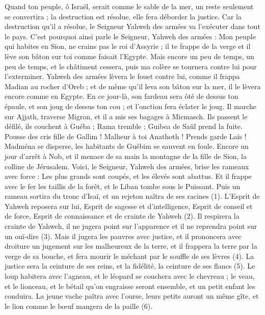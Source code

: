 \begin{multicols}{2}
Quand ton peuple, ô Israël, serait comme le sable de la mer, un reste seulement se convertira ; la destruction est résolue, elle fera déborder la justice.
Car la destruction qu’il a résolue, le Seigneur Yahweh des armées va l’exécuter dans tout le pays.
C'est pourquoi ainsi parle le Seigneur, Yahweh des armées : Mon peuple qui habites en Sion, ne crains pas le roi d'Assyrie ; il te frappe de la verge et il lève son bâton sur toi comme faisait l’Egypte.
Mais encore un peu de temps, un peu de temps, et le châtiment cessera, puis ma colère se tournera contre lui pour l’exterminer.
Yahweh des armées lèvera le fouet contre lui, comme il frappa Madian au rocher d'Oreb ; et de même qu’il leva son bâton sur la mer, il le lèvera encore comme en Egypte.
En ce jour-là, son fardeau sera ôté de dessus ton épaule, et son joug de dessus ton cou ; et l’onction fera éclater le joug.
Il marche sur Ajjath, traverse Migron, et il a mis ses bagages à Micmasch.
Ils passent le défilé, ils couchent à Guéba ; Rama tremble ; Guibea de Saül prend la fuite.
Pousse des cris fille de Gallim ! Malheur à toi Anathoth ! Prends garde Laïs !
Madména se disperse, les habitants de Guébim se sauvent en foule.
Encore un jour d’arrêt à Nob, et il menace de sa main la montagne de la fille de Sion, la colline de Jérusalem.
Voici, le Seigneur, Yahweh des armées, brise les rameaux avec force : Les plus grands sont coupés, et les élevés sont abattus.
Et il frappe avec le fer les taillis de la forêt, et le Liban tombe sous le Puissant.
\VerseOne{}Puis un rameau sortira du tronc d'Isaï, et un rejeton naîtra de ses racines (1).
L'Esprit de Yahweh reposera sur lui, Esprit de sagesse et d'intelligence, Esprit de conseil et de force, Esprit de connaissance et de crainte de Yahweh (2).
Il respirera la crainte de Yahweh, il ne jugera point sur l’apparence et il ne reprendra point sur un ouï-dire (3).
Mais il jugera les pauvres avec justice, et il prononcera avec droiture un jugement sur les malheureux de la terre, et il frappera la terre par la verge de sa bouche, et fera mourir le méchant par le souffle de ses lèvres (4).
La justice sera la ceinture de ses reins, et la fidélité, la ceinture de ses flancs (5).
Le loup habitera avec l'agneau, et le léopard se couchera avec le chevreau ; le veau, et le lionceau, et le bétail qu'on engraisse seront ensemble, et un petit enfant les conduira.
La jeune vache paîtra avec l'ourse, leurs petits auront un même gîte, et le lion comme le bœuf mangera de la paille (6).

\end{multicols}
